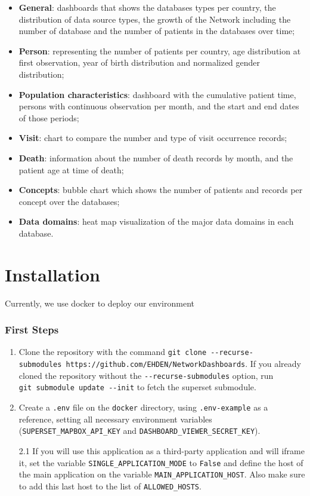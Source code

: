 \documentclass[
]{book}
\providecommand{\tightlist}{%
  \setlength{\itemsep}{0pt}\setlength{\parskip}{0pt}}
\begin{document}
\begin{itemize}
\tightlist
\item
  \textbf{General}: dashboards that shows the databases types per country, the distribution of data source types, the growth of the Network including the number of database and the number of patients in the databases over time;
\item
  \textbf{Person}: representing the number of patients per country, age distribution at first observation, year of birth distribution and normalized gender distribution;
\item
  \textbf{Population characteristics}: dashboard with the cumulative patient time, persons with continuous observation per month, and the start and end dates of those periods;
\item
  \textbf{Visit}: chart to compare the number and type of visit occurrence records;
\item
  \textbf{Death}: information about the number of death records by month, and the patient age at time of death;
\item
  \textbf{Concepts}: bubble chart which shows the number of patients and records per concept over the databases;
\item
  \textbf{Data domains}: heat map visualization of the major data domains in each database.
\end{itemize}

\hypertarget{installation}{%
\chapter{Installation}\label{installation}}

Currently, we use docker to deploy our environment

\hypertarget{first-steps}{%
\subsection*{First Steps}\label{first-steps}}

\begin{enumerate}
\def\labelenumi{\arabic{enumi}.}
\item
  Clone the repository with the command \texttt{git\ clone\ -\/-recurse-submodules\ https://github.com/EHDEN/NetworkDashboards}. If you already cloned the repository without the \texttt{-\/-recurse-submodules} option, run \texttt{git\ submodule\ update\ -\/-init} to fetch the superset submodule.
\item
  Create a \texttt{.env} file on the \texttt{docker} directory, using \texttt{.env-example} as a reference, setting all necessary environment variables (\texttt{SUPERSET\_MAPBOX\_API\_KEY} and \texttt{DASHBOARD\_VIEWER\_SECRET\_KEY}).

  2.1 If you will use this application as a third-party application and will iframe it, set the variable \texttt{SINGLE\_APPLICATION\_MODE} to \texttt{False} and define the host of the main application on the variable \texttt{MAIN\_APPLICATION\_HOST}. Also make sure to add this last host to the list of \texttt{ALLOWED\_HOSTS}.
\end{enumerate}
\end{document}
